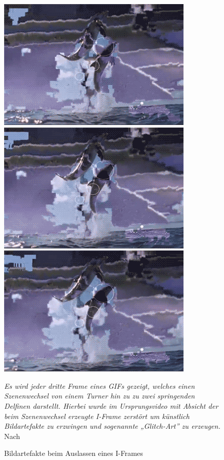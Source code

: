 \begin{figure}[h!]
    \includegraphics[scale=0.566]{images/corruptedGif/frame16.png}
    \includegraphics[scale=0.566]{images/corruptedGif/frame19.png}
    \includegraphics[scale=0.566]{images/corruptedGif/frame22.png}
    \caption{Bildartefakte beim Auslassen eines I-Frames}
    \textit{Es wird jeder dritte Frame eines GIFs gezeigt, welches einen Szenenwechsel von einem Turner hin zu zu zwei springenden Delfinen darstellt. Hierbei wurde im Ursprungsvideo mit Absicht der beim Szenenwechsel erzeugte I-Frame zerstört um künstlich Bildartefakte zu erzwingen und sogenannte „Glitch-Art” zu erzeugen.}
    \linebreak
    Nach \cite{supergif}
    \label{fig:glitch}
\end{figure}

